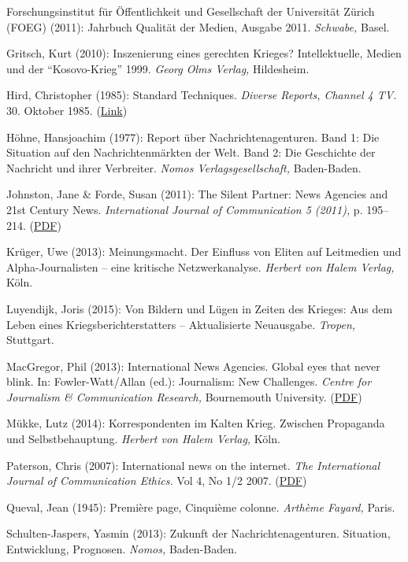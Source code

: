 Forschungsinstitut für Öffentlichkeit und Gesellschaft der Universität
Zürich (FOEG) (2011): Jahrbuch Qualität der Medien, Ausgabe 2011.
\emph{Schwabe,} Basel.

Gritsch, Kurt (2010): Inszenierung eines gerechten Krieges?
Intellektuelle, Medien und der ``Kosovo-Krieg'' 1999. \emph{Georg Olms
Verlag,} Hildesheim.

Hird, Christopher (1985): Standard Techniques. \emph{Diverse Reports,
Channel 4 TV.} 30. Oktober 1985.
(\href{https://swprs.org/video-the-cia-and-the-media/}{Link})

Höhne, Hansjoachim (1977): Report über Nachrichtenagenturen. Band 1: Die
Situation auf den Nachrichtenmärkten der Welt. Band 2: Die Geschichte
der Nachricht und ihrer Verbreiter. \emph{Nomos Verlagsgesellschaft,}
Baden-Baden.

Johnston, Jane \& Forde, Susan (2011): The Silent Partner: News Agencies
and 21st Century News. \emph{International Journal of Communication 5
(2011),} p. 195--214.
(\href{https://ijoc.org/index.php/ijoc/article/view/928}{PDF})

Krüger, Uwe (2013): Meinungsmacht. Der Einfluss von Eliten auf
Leitmedien und Alpha-Journalisten -- eine kritische Netzwerkanalyse.
\emph{Herbert von Halem Verlag,} Köln.

Luyendijk, Joris (2015): Von Bildern und Lügen in Zeiten des Krieges:
Aus dem Leben eines Kriegsberichterstatters -- Aktualisierte Neuausgabe.
\emph{Tropen,} Stuttgart.

MacGregor, Phil (2013): International News Agencies. Global eyes that
never blink. In: Fowler-Watt/Allan (ed.): Journalism: New Challenges.
\emph{Centre for Journalism \& Communication Research,} Bournemouth
University.
(\href{https://microsites.bournemouth.ac.uk/cjcr/files/2013/10/JNC-2013-Chapter-3-MacGregor.pdf}{PDF})

Mükke, Lutz (2014): Korrespondenten im Kalten Krieg. Zwischen Propaganda
und Selbstbehauptung. \emph{Herbert von Halem Verlag,} Köln.

Paterson, Chris (2007): International news on the internet. \emph{The
International Journal of Communication Ethics.} Vol 4, No 1/2 2007.
(\href{http://www.communicationethics.net/journal/v4n1-2/v4n1-2_12.pdf}{PDF})

Queval, Jean (1945): Première page, Cinquième colonne. \emph{Arthème
Fayard,} Paris.

Schulten-Jaspers, Yasmin (2013): Zukunft der Nachrichtenagenturen.
Situation, Entwicklung, Prognosen. \emph{Nomos,} Baden-Baden.

